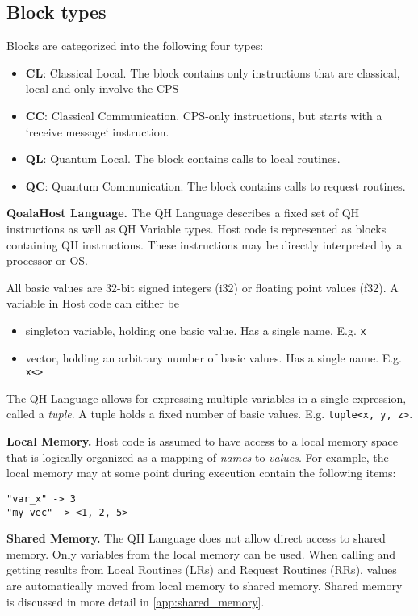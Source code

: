 \subsection{Block types}
Blocks are categorized into the following four types:
\begin{itemize}
\item \textbf{CL}: Classical Local. The block contains only instructions that are classical, local and only involve the CPS
\item \textbf{CC}: Classical Communication. CPS-only instructions, but starts with a `receive message` instruction.
\item \textbf{QL}: Quantum Local. The block contains calls to local routines.
\item \textbf{QC}: Quantum Communication. The block contains calls to request routines.
\end{itemize}


\textbf{QoalaHost Language.}
The QH Language describes a fixed set of QH instructions as well as QH Variable types.
Host code is represented as blocks containing QH instructions.
These instructions may be directly interpreted by a processor or OS.

All basic values are 32-bit signed integers (i32) or floating point values (f32).
A variable in Host code can either be
\begin{itemize}
\item singleton variable, holding one basic value. Has a single name. E.g. \texttt{x}
\item vector, holding an arbitrary number of basic values. Has a single name. E.g. \texttt{x<>}
\end{itemize}

The QH Language allows for expressing multiple variables in a single expression, called a \textit{tuple}.
A tuple holds a fixed number of basic values. E.g. \texttt{tuple<x, y, z>}.

\textbf{Local Memory.}
Host code is assumed to have access to a local memory space that is logically organized as a mapping of \textit{names} to \textit{values}.
For example, the local memory may at some point during execution contain the following items:

\begin{lstlisting}
"var_x" -> 3
"my_vec" -> <1, 2, 5>
\end{lstlisting}


\textbf{Shared Memory.}
The QH Language does not allow direct access to shared memory.
Only variables from the local memory can be used.
When calling and getting results from Local Routines (LRs) and Request Routines (RRs), values are automatically
moved from local memory to shared memory. 
Shared memory is discussed in more detail in \cref{app:shared_memory}.

